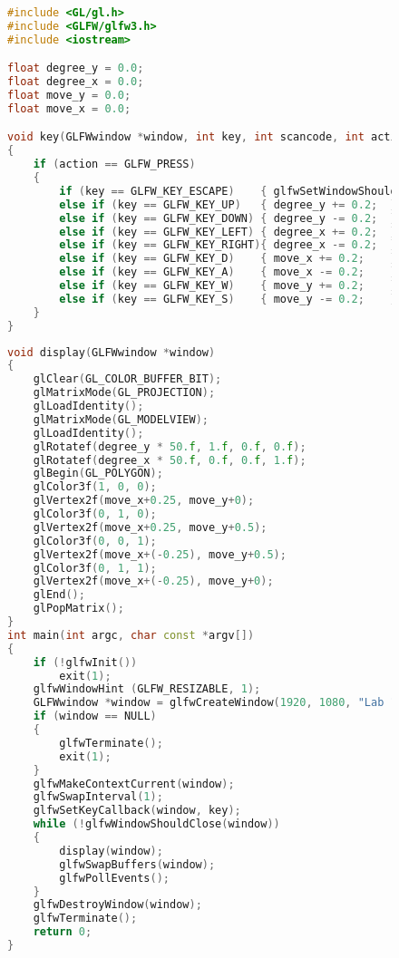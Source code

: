 \documentclass[a4paper, 14pt]{extarticle}
\begin{document}
\begin{figure}[!htb]
\begin{lstlisting}[language={c++},caption={main.cpp},label={lst:code1}]
#include <GL/gl.h>
#include <GLFW/glfw3.h>
#include <iostream>

float degree_y = 0.0;
float degree_x = 0.0;
float move_y = 0.0;
float move_x = 0.0;

void key(GLFWwindow *window, int key, int scancode, int action, int mods)
{
    if (action == GLFW_PRESS)
    {
        if (key == GLFW_KEY_ESCAPE)    { glfwSetWindowShouldClose(window, GL_TRUE);   }
        else if (key == GLFW_KEY_UP)   { degree_y += 0.2;  }
        else if (key == GLFW_KEY_DOWN) { degree_y -= 0.2;  }
        else if (key == GLFW_KEY_LEFT) { degree_x += 0.2;  }
        else if (key == GLFW_KEY_RIGHT){ degree_x -= 0.2;  }
        else if (key == GLFW_KEY_D)    { move_x += 0.2;    }
        else if (key == GLFW_KEY_A)    { move_x -= 0.2;    }
        else if (key == GLFW_KEY_W)    { move_y += 0.2;    }
        else if (key == GLFW_KEY_S)    { move_y -= 0.2;    }
    }
}
\end{lstlisting}
\end{figure}

\begin{figure}[!htb]
\begin{lstlisting}[language={c++},caption={main.cpp(продолжение)},label={lst:code2}]
void display(GLFWwindow *window)
{
    glClear(GL_COLOR_BUFFER_BIT);
    glMatrixMode(GL_PROJECTION);
    glLoadIdentity();
    glMatrixMode(GL_MODELVIEW);
    glLoadIdentity();
    glRotatef(degree_y * 50.f, 1.f, 0.f, 0.f);
    glRotatef(degree_x * 50.f, 0.f, 0.f, 1.f);
    glBegin(GL_POLYGON);
    glColor3f(1, 0, 0);
    glVertex2f(move_x+0.25, move_y+0);
    glColor3f(0, 1, 0);
    glVertex2f(move_x+0.25, move_y+0.5);
    glColor3f(0, 0, 1);
    glVertex2f(move_x+(-0.25), move_y+0.5);
    glColor3f(0, 1, 1);
    glVertex2f(move_x+(-0.25), move_y+0);
    glEnd();
    glPopMatrix();
}
int main(int argc, char const *argv[])
{
    if (!glfwInit())
        exit(1);
    glfwWindowHint (GLFW_RESIZABLE, 1);
    GLFWwindow *window = glfwCreateWindow(1920, 1080, "Lab 1", glfwGetPrimaryMonitor(), NULL);
    if (window == NULL)
    {
        glfwTerminate();
        exit(1);
    }    
    glfwMakeContextCurrent(window);
    glfwSwapInterval(1);
    glfwSetKeyCallback(window, key);
    while (!glfwWindowShouldClose(window))
    {
        display(window);
        glfwSwapBuffers(window);
        glfwPollEvents();
    }
    glfwDestroyWindow(window);
    glfwTerminate();
    return 0;
}
\end{lstlisting}
\end{figure}
\end{document}
